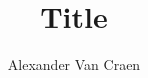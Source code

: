 \documentclass[11pt, t, usernames, dvipsnames,
	aspectratio=169, %
]{beamer}
\title[Title footer]{Title}
\author[Alexander Van Craen]{Alexander Van Craen}
\institute{Institute for Parallel and Distributed Systems}{IPVS}
\begin{document}
	\titleslide

	\tocslide



	



	\finalslide


\end{document}
